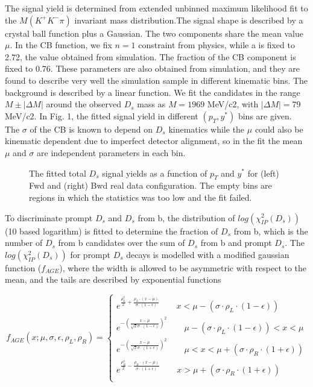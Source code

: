 \documentclass[
10pt, %
a4paper, %
oneside, %
headinclude,footinclude, %
BCOR5mm, %
]{scrartcl}
\begin{document}
The signal yield is determined from extended unbinned maximum likelihood fit to the $M(K^+K^-\pi)$ invariant mass distribution.The signal shape is described by a crystal ball function plus a Gaussian. The two components share the mean value $\mu$. In the CB function, we fix $n = 1$ constraint from physics, while a is fixed to 2.72, the value obtained from simulation. The fraction of the CB component is fixed to 0.76. These parameters are also obtained from simulation, and they are found to describe very well the simulation sample in different kinematic bins. The background is described by a linear function. We fit the candidates in the range $M \pm |\Delta M|$ around the observed $D_s$ mass as $M =1969$ MeV/c2, with $|\Delta M| = 79$ MeV/c2. In Fig. 1, the fitted signal yield in different $(p_T,y^*)$ bins are given. The $\sigma$ of the CB is known to depend on $D_s$ kinematics while the $\mu$ could also be kinematic dependent due to imperfect detector alignment, so in the fit the mean $\mu$ and $\sigma$ are independent parameters in each bin.\par

\begin{figure}[tb]
\centering
{} \quad
{} \quad
\caption[Signal yield]{The fitted total $D_s$ signal yields as a function of $p_T$ and $y^*$ for (left) Fwd and (right) Bwd real data configuration. The empty bins are regions in which the statistics was too low and the fit failed.} %
\label{fig:esempio}
\end{figure}


To discriminate prompt $D_s$ and $D_s$ from b, the distribution of $log(\chi^2_{IP}(D_s))$ (10 based logarithm) is fitted to determine the fraction of $D_s$ from b, which is the number of $D_s$ from b candidates over the sum of $D_s$ from b and prompt $D_s$. The $log(\chi^2_{IP}(D_s))$ for prompt $D_s$ decays is modelled with a modified gaussian function ($f_{AGE}$), where the width is allowed to be asymmetric with respect to the mean, and the tails are described by exponential functions


\begin{equation}
f_{AGE}(x;\mu,\sigma,\epsilon,\rho_L,\rho_R)=\left\{
\begin{aligned}
e^{\frac{\rho_L^2}{2}+\frac{\rho_L\cdot (x-\mu)}{\sigma \cdot (1-\epsilon)}} \quad\quad {x<\mu-(\sigma \cdot \rho_L\cdot(1-\epsilon))}\\
e^{-(\frac{x-\mu}{\sqrt{2}\sigma \cdot (1-\epsilon)})^2} \quad\quad {\mu-(\sigma \cdot \rho_L\cdot(1-\epsilon))<x<\mu}\\
e^{-(\frac{x-\mu}{\sqrt{2}\sigma \cdot (1+\epsilon)})^2} \quad\quad \mu <x<\mu+(\sigma \cdot \rho_R\cdot(1+\epsilon))\\
e^{\frac{\rho_R^2}{2}-\frac{\rho_R\cdot (x-\mu)}{\sigma \cdot (1+\epsilon)}} \quad\quad {x>\mu+(\sigma \cdot \rho_R\cdot(1+\epsilon))}\\
\end{aligned}
\right.
\end{equation}
\end{document}
